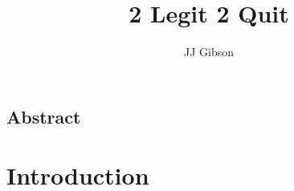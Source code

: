 \documentclass[twoside,10pt]{report}
\newcommand{\clearemptydoublepage}{\newpage{\pagestyle{empty}\cleardoublepage}}
\begin{document}
\title{2 Legit 2 Quit}
\author{JJ Gibson}



\clearpage


\clearemptydoublepage
\setcounter{page}{1}

\begin{centering} \section*{Abstract} \end{centering}


\tableofcontents
\clearpage


\setcounter{page}{1}


\chapter{Introduction}
\label{chap:introduction}


\clearpage

 
{\small }
\end{document}
